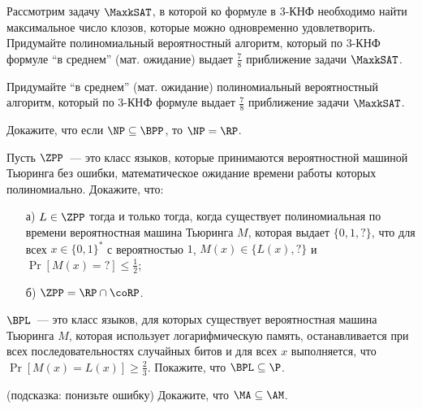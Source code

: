 
\begin{task}
    Рассмотрим задачу $\MaxkSAT$, в которой ко формуле в $3$-КНФ необходимо найти максимальное число клозов, которые можно
    одновременно удовлетворить. Придумайте полиномиальный вероятностный алгоритм, который по $3$-КНФ формуле ``в среднем''
    (мат. ожидание) выдает $\frac{7}{8}$ приближение задачи $\MaxkSAT$.
\end{task}

\begin{task}
	Придумайте ``в среднем'' (мат. ожидание) полиномиальный вероятностный алгоритм, который по $3$-КНФ формуле выдает
    $\frac{7}{8}$ приближение задачи $\MaxkSAT$.
\end{task}

\begin{task}
    Докажите, что если $\NP \subseteq \BPP$, то $\NP = \RP$.
\end{task}


\begin{task}
    Пусть $\ZPP$~--- это класс языков, которые принимаются вероятностной машиной Тьюринга без ошибки, математическое ожидание
    времени работы которых полиномиально. Докажите, что:
    \begin{enumerate}[topsep = 0pt, itemsep = -1ex]
        \item [а)] $L \in \ZPP$ тогда и только тогда, когда существует полиномиальная по времени вероятностная машина Тьюринга
			$M$, которая выдает $\{0, 1, ?\}$, что для всех $x \in \{0, 1\}^*$ с вероятностью $1$, $M(x) \in \{L(x), ?\}$ и 
            $\Pr[M(x) = {?}] \le \frac{1}{2}$;
        \item [б)] $\ZPP = \RP \cap \coRP$.
    \end{enumerate}
\end{task}

\begin{task}
    $\BPL$~--- это класс языков, для которых существует вероятностная машина Тьюринга $M$, которая использует логарифмическую
    память, останавливается при всех последовательностях случайных битов и для всех $x$ выполняется, что $\Pr[M(x) = L(x)] \ge
    \frac{2}{3}$. Покажите, что $\BPL \subseteq \P$. 
\end{task}


\begin{task}(подсказка: понизьте ошибку)
	Докажите, что $\MA \subseteq \AM$.
\end{task}



